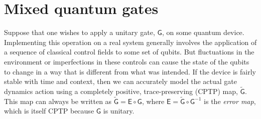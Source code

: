 \documentclass[aps,nofootinbib,pra,notitlepage,twocolumn]{revtex4-1}
\newcommand{\tr}{{\rm Tr\thinspace}}
\begin{document}
\section{Mixed quantum gates}
\label{sec:representing_quantum_gates}

\noindent Suppose that one wishes to apply a unitary gate, $\mathsf{G}$, on some quantum device. Implementing this operation on a real system generally involves the application of a sequence of classical control fields to some set of qubits.  But fluctuations in the environment or imperfections in these controls can cause the state of the qubits to change in a way that is different from what was intended. If the device is fairly stable with time and context\cite{1810.05651}, then we can accurately model the actual gate dynamics action using a completely positive, trace-preserving (CPTP) map, $\mathsf{\tilde G}$. This map can always be written as $\mathsf{\tilde G} = \mathsf{E}\circ\mathsf{G}$, where $\mathsf{E} = \mathsf{\tilde G}\circ\mathsf{G}^{-1}$ is the \emph{error map}, which is itself CPTP because $\mathsf{G}$ is unitary.

\end{document}
